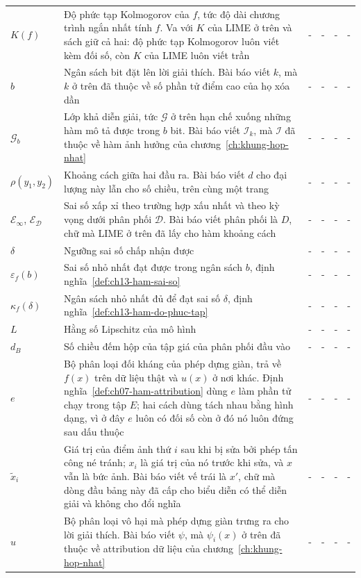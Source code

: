 \begin{longtable}{@{}lp{\kyhieuw}p{\kyhieuwmap}p{\kyhieuwmap}p{\kyhieuwmap}p{\kyhieuwlast}@{}}
$K(f)$ & Độ phức tạp Kolmogorov của $f$, tức độ dài chương trình ngắn nhất tính $f$. Va với $K$ của LIME ở trên và sách giữ cả hai: độ phức tạp Kolmogorov luôn viết kèm đối số, còn $K$ của LIME luôn viết trần & - & - & - & - \\
$b$ & Ngân sách bit đặt lên lời giải thích. Bài báo viết $k$, mà $k$ ở trên đã thuộc về số phần tử điểm cao của họ xóa dần & - & - & - & - \\
$\mathcal{G}_b$ & Lớp khả diễn giải, tức $\mathcal{G}$ ở trên hạn chế xuống những hàm mô tả được trong $b$ bit. Bài báo viết $\mathcal{I}_k$, mà $\mathcal{I}$ đã thuộc về hàm ảnh hưởng của chương~\ref{ch:khung-hop-nhat} & - & - & - & - \\
$\rho(y_1,y_2)$ & Khoảng cách giữa hai đầu ra. Bài báo viết $d$ cho đại lượng này lẫn cho số chiều, trên cùng một trang & - & - & - & - \\
$\mathcal{E}_{\infty}$, $\mathcal{E}_{\mathcal{D}}$ & Sai số xấp xỉ theo trường hợp xấu nhất và theo kỳ vọng dưới phân phối $\mathcal{D}$. Bài báo viết phân phối là $D$, chữ mà LIME ở trên đã lấy cho hàm khoảng cách & - & - & - & - \\
$\delta$ & Ngưỡng sai số chấp nhận được & - & - & - & - \\
$\varepsilon_f(b)$ & Sai số nhỏ nhất đạt được trong ngân sách $b$, định nghĩa~\ref{def:ch13-ham-sai-so} & - & - & - & - \\
$\kappa_f(\delta)$ & Ngân sách nhỏ nhất đủ để đạt sai số $\delta$, định nghĩa~\ref{def:ch13-ham-do-phuc-tap} & - & - & - & - \\
$L$ & Hằng số Lipschitz của mô hình & - & - & - & - \\
$d_B$ & Số chiều đếm hộp của tập giá của phân phối đầu vào & - & - & - & - \\
$e$ & Bộ phân loại đối kháng của phép dựng giàn, trả về $f(x)$ trên dữ liệu thật và $u(x)$ ở nơi khác. Định nghĩa~\ref{def:ch07-ham-attribution} dùng $e$ làm phần tử chạy trong tập $E$; hai cách dùng tách nhau bằng hình dạng, vì ở đây $e$ luôn có đối số còn ở đó nó luôn đứng sau dấu thuộc & - & - & - & - \\
$\tilde{x}_i$ & Giá trị của điểm ảnh thứ $i$ sau khi bị sửa bởi phép tấn công né tránh; $x_i$ là giá trị của nó trước khi sửa, và $x$ vẫn là bức ảnh. Bài báo viết vế trái là $x'$, chữ mà dòng đầu bảng này đã cấp cho biểu diễn có thể diễn giải và không cho đổi nghĩa & - & - & - & - \\
$u$ & Bộ phân loại vô hại mà phép dựng giàn trưng ra cho lời giải thích. Bài báo viết $\psi$, mà $\psi_i(x)$ ở trên đã thuộc về attribution dữ liệu của chương~\ref{ch:khung-hop-nhat} & - & - & - & - \\

\end{longtable}
